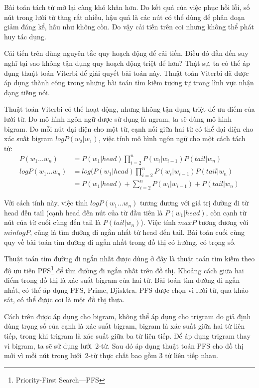 \documentclass[a4paper,oneside,14pt]{extbook} %
\begin{document}
Bài toán tách từ mờ lại càng khó khăn hơn. Do kết quả của việc phục
hồi lỗi, số nút trong lưới từ tăng rất nhiều, hậu quả là các nút có
thể dùng để phân đoạn giảm đáng kể, hầu như không còn. Do vậy cải tiến
trên coi nhưng không thể phát huy tác dụng.

Cải tiến trên dùng nguyên tắc quy hoạch động để cải tiến. Điều đó dẫn
đến suy nghĩ tại sao không tận dụng quy hoạch động triệt để hơn? Thật
sự, ta có thể áp dụng thuật toán Viterbi để giải quyết bài toán
này. Thuật toán Viterbi đã được áp dụng thành công trong những bài
toán tìm kiếm tương tự trong lĩnh vực nhận dạng tiếng nói.

Thuật toán Viterbi có thể hoạt động, nhưng không tận dụng triệt để ưu
điểm của lưới từ. Do mô hình ngôn ngữ được sử dụng là ngram, ta sẽ
dùng mô hình bigram. Do mỗi nút đại diện cho một từ, cạnh nối giữa hai
từ có thể đại diện cho xác suất bigram $logP(w_2|w_1)$, việc tính mô
hình ngôn ngữ cho một cách tách từ:
\begin{align*}
  P(w_1\ldots w_n)&= P(w_1|head)\prod_{i=2}^nP(w_i|w_{i-1})P(tail|w_n)\\
  logP(w_1\ldots w_n)&= log(P(w_1|head)\prod_{i=2}^nP(w_i|w_{i-1})P(tail|w_n)\\
  &=P(w_1|head)+\sum_{i=2}^nP(w_i|w_{i-1})+P(tail|w_n)
\end{align*}

Với cách tính này, việc tính $logP(w_1\ldots w_n)$ tương đương với giá
trị đường đi từ head đến tail (cạnh head đến nút của từ đầu tiên là
$P(w_1|head)$, còn cạnh từ nút của từ cuối cùng đến tail là
$P(tail|w_n)$). Việc tính $maxP$ tương đương với $minlogP$, cũng là
tìm đướng đi ngắn nhất từ head đến tail. Bài toán cuối cùng quy về bài
toán tìm đường đi ngắn nhất trong đồ thị có hướng, có trọng số.

Thuật toán tìm đường đi ngắn nhất được dùng ở đây là thuật toán tìm
kiếm theo độ ưu tiên PFS\footnote{Priority-First Search---PFS} để tìm
đường đi ngắn nhất trên đồ thị. Khoảng cách giữa hai 
điểm trong đồ thị là xác suất bigram của hai từ. Bài toán tìm đường
đi ngắn nhất, có thể áp dụng PFS, Prime, Djisktra. PFS được chọn vì
lưới từ, qua khảo sát, có thể được coi là một đồ thị thưa.

Cách trên được áp dụng cho bigram, không thể áp dụng cho trigram do
giả định dùng trọng số của cạnh là xác suất bigram, bigram là xác suất
giữa hai từ liên tiếp, trong khi trigram là xác suất giữa ba từ liên
tiếp. Để áp dụng trigram thay vì bigram, ta sẽ sử dụng lưới~2-từ. Sau
đó áp dụng thuật toán PFS cho đồ thị mới vì mỗi nút trong lưới~2-từ
thực chất bao gồm 3 từ liên tiếp nhau.
\end{document}
